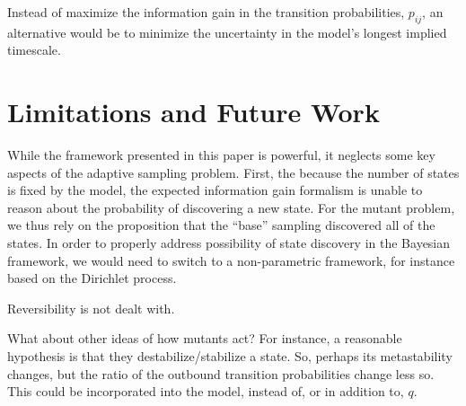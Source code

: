 \documentclass[twocolumn,floatfix,nofootinbib,aps]{revtex4-1}
\begin{document}
Instead of maximize the information gain in the transition probabilities, $p_{ij}$, an alternative would be to minimize the uncertainty in the model's longest implied timescale.

\section{Limitations and Future Work}
While the framework presented in this paper is powerful, it neglects some key aspects of the adaptive sampling problem. First, the because the number of states is fixed by the model, the expected information gain formalism is unable to reason about the probability of discovering a new state. For the mutant problem, we thus rely on the proposition that the ``base'' sampling discovered all of the states. In order to properly address possibility of state discovery in the Bayesian framework, we would need to switch to a non-parametric framework, for instance based on the Dirichlet process.

Reversibility is not dealt with.

What about other ideas of how mutants act? For instance, a reasonable hypothesis is that they destabilize/stabilize a state. So, perhaps its metastability changes, but the ratio of the outbound transition probabilities change less so. This could be incorporated into the model, instead of, or in addition to, $q$.
\end{document}
